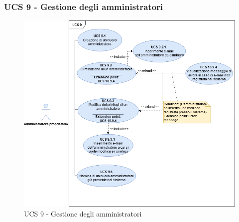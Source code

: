 \newpage

\subsubsection{UCS 9 - Gestione degli amministratori}%

\begin{figure}[h!]
    \centering
      \includegraphics[scale=0.5]{Sezioni/UseCase/Immagini/UCS9.png}
    \caption{UCS 9 - Gestione degli amministratori}
  \end{figure}
